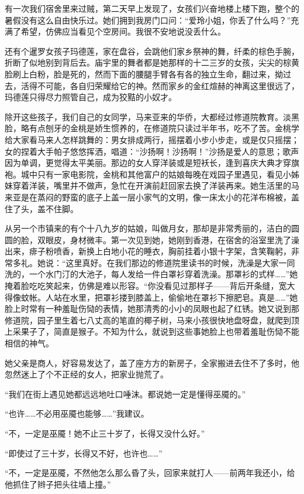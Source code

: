 \par 有一次我们宿舍里来过贼，第二天早上发现了，女孩们兴奋地楼上楼下跑，整个的暑假没有这么自由快乐过。她们拥到我房门口问：“爱玲小姐，你丢了什么吗？”充满了希望，仿佛应当看见个空房间。我很不安地说没丢什么。
\par 还有个暹罗女孩子玛德莲，家在盘谷，会跳他们家乡祭神的舞，纤柔的棕色手腕，折断了似地别到背后去。庙宇里的舞者都是她那样的十二三岁的女孩，尖尖的棕黄脸刷上白粉，脸是死的，然而下面的腰腿手臂各有各的独立生命，翻过来，拗过去，活得不可能，各自归荣耀给它的神。然而家乡的金红煊赫的神离这里很远了，玛德莲只得尽力照管自己，成为狡黠的小奴才。
\par 除开这些孩子，我们自己的女同学，马来亚来的华侨，大都经过修道院教育。淡黑脸，略有点刨牙的金桃是娇生惯养的，在修道院只读过半年书，吃不了苦。金桃学给大家看马来人怎样跳舞的：男女排成两行，摇摆着小步小步走，或是仅只摇摆；女的捏着大手帕子悠悠挥洒，唱道：“沙扬啊！沙扬啊！”沙扬是爱人的意思；歌声因为单调，更觉得太平美丽。那边的女人穿洋装或是短袄长，逢到喜庆大典才穿旗袍。城中只有一家电影院，金桃和其他富户的姑娘每晚在戏园子里遇见，看见小姊妹穿着洋装，嘴里并不做声，急忙在开演前赶回家去换了洋装再来。她生活里的马来亚是在蒸闷的野蛮的底子上盖一层小家气的文明，像一床太小的花洋布棉被，盖住了头，盖不住脚。
\par 从另一个市镇来的有个十八九岁的姑娘，叫做月女，那却是非常秀丽的，洁白的圆圆的脸，双眼皮，身材微丰。第一次见到她，她刚到香港，在宿舍的浴室里洗了澡出来，痱子粉喷香，新换上白地小花的睡衣，胸前挂着小银十字架，含笑鞠躬，非常多礼。她说：“这里真好。在我们那边的修道院里读书的时候，洗澡是大家一同洗的，一个水门汀的大池子，每人发给一件白罩衫穿着洗澡。那罩衫的式样……”她掩着脸吃吃笑起来，仿佛是难以形容。“你没看见过那样子——背后开条缝，宽大得像蚊帐。人站在水里，把罩衫搂到膝盖上，偷偷地在罩衫下擦肥皂。真是……”她脸上时常有一种羞耻伤恸的表情，她那清秀的小小的凤眼也起了红锈。她又说到那修道院，园子里生着七八丈高的笔直的椰子树，马来小孩很快地盘呀盘，就爬到顶上采果子了，简直是猴子。不知为什么，就说到这些事她脸上也带着羞耻伤恸不能相信的神气。
\par 她父亲是商人，好容易发达了，盖了座方方的新房子，全家搬进去住不了多时，他忽然迷上了个不正经的女人，把家业抛荒了。
\par “我们在街上遇见她都远远地吐口唾沫。都说她一定是懂得巫魇的。”
\par “也许……不必用巫魇也能够……”我建议。
\par “不，一定是巫魇！她不止三十岁了，长得又没什么好。”
\par “即使过了三十岁，长得又不好，也许也……”
\par “不，一定是巫魇，不然他怎么那么昏了头，回家来就打人——前两年我还小，给他抓住了辫子把头往墙上撞。”
